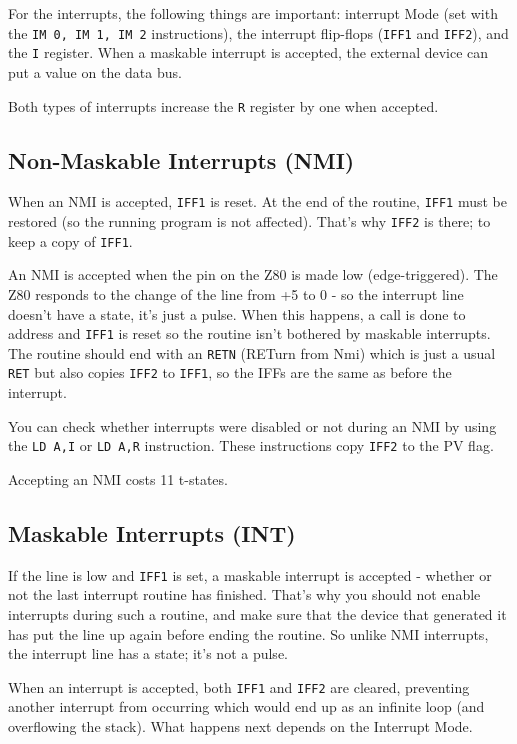 For the interrupts, the following things are important: interrupt Mode (set with the {\tt IM 0, IM 1, IM 2} instructions), the interrupt flip-flops ({\tt IFF1} and {\tt IFF2}), and the {\tt I} register. When a maskable interrupt is accepted, the external device can put a value on the data bus.

Both types of interrupts increase the {\tt R} register by one when accepted.


\subsection{Non-Maskable Interrupts (NMI)}

When an NMI is accepted, {\tt IFF1} is reset. At the end of the routine, {\tt IFF1} must be restored (so the running program is not affected). That's why {\tt IFF2} is there; to keep a copy of {\tt IFF1}.

An NMI is accepted when the  pin on the Z80 is made low (edge-triggered). The Z80 responds to the change of the line from +5 to 0 - so the interrupt line doesn't have a state, it's just a pulse. When this happens, a call is done to address  and {\tt IFF1} is reset so the routine isn't bothered by maskable interrupts. The routine should end with an {\tt RETN} (RETurn from Nmi) which is just a usual {\tt RET} but also copies {\tt IFF2} to {\tt IFF1}, so the IFFs are the same as before the interrupt.

You can check whether interrupts were disabled or not during an NMI by using the {\tt LD A,I} or {\tt LD A,R} instruction. These instructions copy {\tt IFF2} to the PV flag.

Accepting an NMI costs 11 t-states.


\subsection{Maskable Interrupts (INT)}

If the  line is low and {\tt IFF1} is set, a maskable interrupt is accepted - whether or not the last interrupt routine has finished. That's why you should not enable interrupts during such a routine, and make sure that the device that generated it has put the  line up again before ending the routine. So unlike NMI interrupts, the interrupt line has a state; it's not a pulse.

When an interrupt is accepted, both {\tt IFF1} and {\tt IFF2} are cleared, preventing another interrupt from occurring which would end up as an infinite loop (and overflowing the stack). What happens next depends on the Interrupt Mode.

